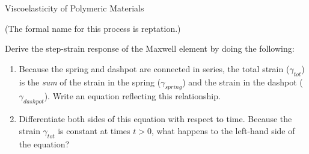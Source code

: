 \begin{activity}{Viscoelasticity of Polymeric Materials}
\begin{exercises}
\begin{enumerate}
\begin{solution}
{						(The formal name for this process is reptation.)
					}\end{solution}
					
			\end{enumerate}
			
		
		
			
		\exercise \label{\labelbase:exc:maxwell} Derive the step-strain response of the Maxwell element by doing the following:
			
			\begin{enumerate}
					
				\item Because the spring and dashpot are connected in series, the total strain ($\gamma_{tot}$) is the \emph{sum} of the strain in the spring ($\gamma_{spring}$) and the strain in the dashpot ($\gamma_{dashpot}$).  Write an equation reflecting this relationship.
				
					\begin{solution}\end{solution}
					
				\item Differentiate both sides of this equation with respect to time.  Because the strain $\gamma_{tot}$ is constant at times $t>0$, what happens to the left-hand side of the equation?
				
					\begin{solution}
\end{solution}
\end{enumerate}
\end{exercises}
\end{activity}
